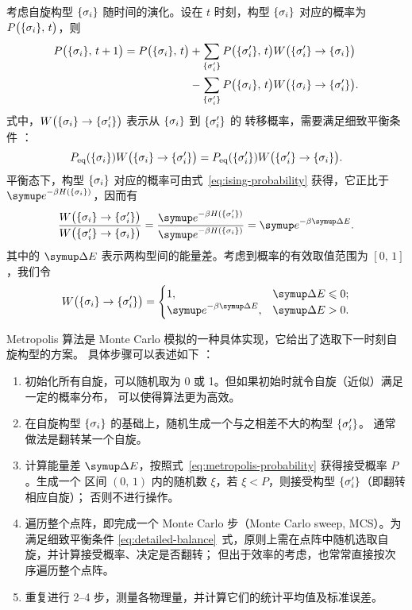 考虑自旋构型 ${\{\sigma_i\}}$ 随时间的演化。设在 $t$ 时刻，构型 ${\{\sigma_i\}}$ 对应的概率为
$P\qty\big({\{\sigma_i\}},\,t)$，则 \cite{pathria,landau2005guide}
\begin{align}
  P\qty\big({\{\sigma_i\}},\,t+1) = P\qty\big({\{\sigma_i\}},\,t)
  &+ \sum_{{\{\sigma'_i\}}} P\qty\big({\{\sigma'_i\}},\,t) W\qty\big({\{\sigma'_i\}}\to{\{\sigma_i\}})
     \notag \\
  &- \sum_{{\{\sigma'_i\}}} P\qty\big({\{\sigma_i\}},\,t)  W\qty\big({\{\sigma_i\}}\to{\{\sigma'_i\}}).
\end{align}
式中，$W\qty\big({\{\sigma_i\}}\to{\{\sigma'_i\}})$ 表示从 ${\{\sigma_i\}}$ 到 ${\{\sigma'_i\}}$ 的
转移概率，需要满足细致平衡条件 \cite{pathria,landau2005guide}：
\begin{equation}
  \label{eq:detailed-balance}
    P_{\text{eq}}({\{\sigma_i\}})  W\qty\big({\{\sigma_i\}}\to{\{\sigma'_i\}})
  = P_{\text{eq}}({\{\sigma'_i\}}) W\qty\big({\{\sigma'_i\}}\to{\{\sigma_i\}}).
\end{equation}
平衡态下，构型 ${\{\sigma_i\}}$ 对应的概率可由式~\eqref{eq:ising-probability} 获得，它正比于
$\ee^{-\beta H(\q{\sigma_i})}$，因而有
\begin{equation}
    \frac{W\qty\big(\q{\sigma_i}\to\q{\sigma'_i})}{W\qty\big(\q{\sigma'_i}\to\q{\sigma_i})}
  = \frac{\ee^{-\beta H(\q{\sigma'_i})}}{\ee^{-\beta H(\q{\sigma_i})}}
  = \ee^{-\beta \incr{E}}.
\end{equation}
其中的 $\incr{E}$ 表示两构型间的能量差。考虑到概率的有效取值范围为 $[0,\,1]$，我们令
\begin{equation}
  \label{eq:metropolis-probability}
  W\qty\big(\q{\sigma_i}\to\q{\sigma'_i}) =
  \begin{cases}
    1, & \incr{E} \leqslant 0; \\
    \ee^{-\beta \incr{E}}, & \incr{E} > 0.
  \end{cases}
\end{equation}

Metropolis 算法是 Monte Carlo 模拟的一种具体实现，它给出了选取下一时刻自旋构型的方案。
具体步骤可以表述如下 \cite{pathria,landau2005guide,binder2010monte}：

\begin{enumerate}
  \item 初始化所有自旋，可以随机取为 0 或 1。但如果初始时就令自旋（近似）满足一定的概率分布，
    可以使得算法更为高效。
  \item 在自旋构型 ${\{\sigma_i\}}$ 的基础上，随机生成一个与之相差不大的构型 ${\{\sigma'_i\}}$。
    通常做法是翻转某一个自旋。
  \item 计算能量差 $\incr{E}$，按照式~\eqref{eq:metropolis-probability} 获得接受概率 $P$。生成一个
    区间 $(0,\,1)$ 内的随机数 $\xi$，若 $\xi<P$，则接受构型 ${\{\sigma'_i\}}$（即翻转相应自旋）；
    否则不进行操作。
  \item 遍历整个点阵，即完成一个 Monte Carlo 步（Monte Carlo sweep, MCS）。为满足细致平衡条件
    \eqref{eq:detailed-balance}~式，原则上需在点阵中随机选取自旋，并计算接受概率、决定是否翻转；
    但出于效率的考虑，也常常直接按次序遍历整个点阵。
  \item 重复进行 2--4 步，测量各物理量，并计算它们的统计平均值及标准误差。
\end{enumerate}

